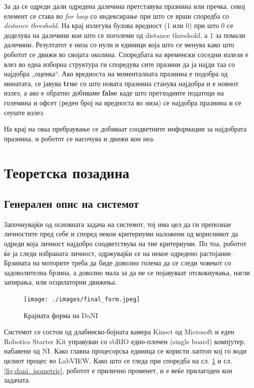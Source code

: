 \documentclass[11pt]{article}
\begin{document}
    За да се одреди дали одредена далечина претставува празнина или пречка, секој елемент се става во \textit{for loop} со индексирање при што се врши споредба со \textit{distance threshold}. На крај излегува булова вредност (1 или 0) при што 0 се доделува на далечини кои што се поголеми од distance threshold, а 1 за помали далечини. Резултатот е низа со нули и единици која што се менува како што роботот се движи во својата околина. Споредбата на временски соседни излези е влез во една изборна структура ги споредува сите празини да ја најди таа со најдобра „оценка“. Ако вредноста на моменталната празнина е подобра од минатата, се јавува \textbf{true} со што новата празнина станува најдобра и е новиот излез, а ако е обратно добиваме \textbf{false} каде што претходните податоци на големина и офсет (реден број на вредноста во низа) се најдобра празнина и се сеуште излез.

    На крај на оваа пребраување се добиваат соодветните информации за најдобрата празнина, и роботот се насочува и движи кон неа.

\newpage

\section{Теоретска позадина}

  \subsection{Генерален опис на системот}
    \label{sec:general_desc}

    Започнувајќи од основната задача на системот, тој има цел да ги препознае личностите пред себе и според некои критериуми наложени од корисникот да одреди која личност најдобро соодветствува на тие критериуми. По тоа, роботот ќе ја следи избраната личност, одржувајќи се на некое одредено растојание. Брзината на моторите треба да биде доволно голема да се следи човекот со задоволителна брзина, а доволно мала за да не се појавуваат отскокнувања, нагли запирања, или осцилаторни движења.
    \begin{figure}[H]
      \centering
      \label{fig:final_form}
      \texttt{[image: ./images/final\_form.jpeg]}
      \caption{Крајната форма на DaNI}
    \end{figure}
    Системот се состои од длабинско-бојната камера Kinect од Microsoft и еден Robotics Starter Kit управуван со sbRIO едно-плочен (single board) компјутер, набавени од NI. Како главна процесорска единица се користи лаптоп кој го води целиот процес во LabVIEW. Како што се гледа при споредба на сл. \ref{fig:final_form} и сл. \ref{fig:dani_isometric}, роботот е прилично променет, и е веќе прилагоден кон задачата.
\end{document}

